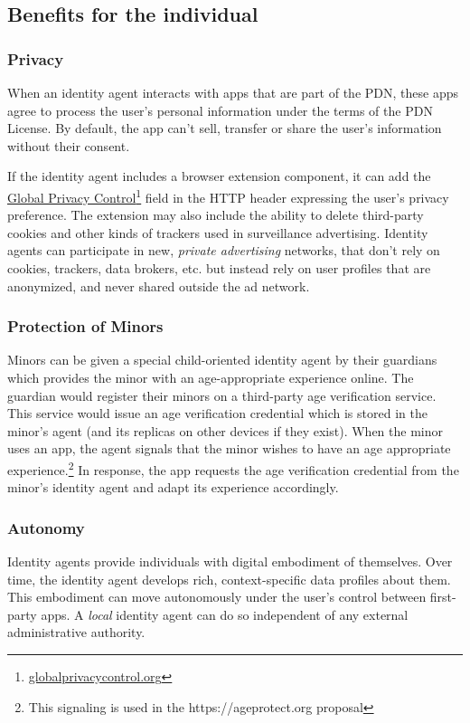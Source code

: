 \documentclass[11pt, oneside]{article}   	%
\newcommand{\hyperfootnote}[1][]{\def\ArgI{{#1}}\hyperfootnoteRelay}
\newcommand\hyperfootnoteRelay[2][]{\href{#1#2}{\ArgI}\footnote{\href{#1#2}{#2}}}
\begin{document}
\subsection{Benefits for the individual}

\subsubsection{Privacy}

When an identity agent interacts with apps that are part of the PDN, these apps agree to process the user's personal information under the terms of the PDN License. By default, the app can't sell, transfer or share the user's information without their consent. 

If the identity agent includes a browser extension component, it can add the \hyperfootnote[Global Privacy Control][https://]{globalprivacycontrol.org} field in the HTTP header expressing the user's privacy preference. The extension may also include the ability to delete third-party cookies and other kinds of trackers used in surveillance advertising. Identity agents can participate in new, \emph{private advertising} networks, that don't rely on cookies, trackers, data brokers, etc. but instead rely on user profiles that are anonymized, and never shared outside the ad network. 

\subsubsection{Protection of Minors}

Minors can be given a special child-oriented identity agent by their guardians which provides the minor with an age-appropriate experience online. The guardian would register their minors on a third-party age verification service. This service would issue  an age verification credential which is stored in the minor's agent (and its replicas on other devices if they exist). When the minor uses an app, the agent signals that the minor wishes to have an age appropriate experience.\footnote{This signaling is used in the https://ageprotect.org proposal} In response, the app requests the age verification credential from the minor's identity agent and adapt its experience accordingly.

\subsubsection{Autonomy}

Identity agents provide individuals with digital embodiment of themselves. Over time, the identity agent develops rich, context-specific data profiles about them. This embodiment can move autonomously under the user's control between first-party apps. A \emph{local} identity agent can do so independent of any external administrative authority. 
\end{document}
